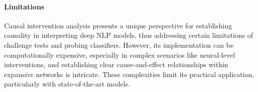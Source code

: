 \paragraph{Limitations} Causal intervention analysis presents a unique perspective for establishing causality in interpreting deep NLP models, thus addressing certain limitations of challenge tests and probing classifiers. However, its implementation can be computationally expensive, especially in complex scenarios like neural-level interventions, and establishing clear cause-and-effect relationships within expansive networks is intricate. These complexities limit its practical application, particularly with state-of-the-art models.

